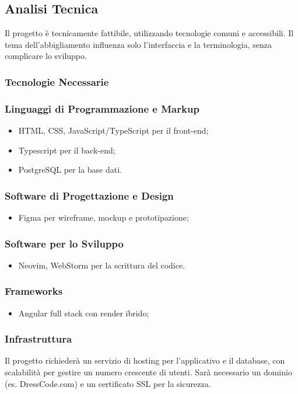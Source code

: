 \documentclass[11pt]{article}
\begin{document}
\subsection{Analisi Tecnica}
Il progetto è tecnicamente fattibile, utilizzando tecnologie comuni e accessibili. Il tema dell'abbigliamento influenza solo l'interfaccia e la terminologia, senza complicare lo sviluppo.

\subsubsection{Tecnologie Necessarie}
\subsubsection*{Linguaggi di Programmazione e Markup}
\begin{itemize}
    \item HTML, CSS, JavaScript/TypeScript per il front-end;
    \item Typescript per il back-end;
    \item PostgreSQL per la base dati.
\end{itemize}

\subsubsection*{Software di Progettazione e Design}
\begin{itemize}
    \item Figma per wireframe, mockup e prototipazione;
\end{itemize}

\subsubsection*{Software per lo Sviluppo}
\begin{itemize}
    \item Neovim, WebStorm per la scrittura del codice.
\end{itemize}

\subsubsection*{Frameworks}
\begin{itemize}
    \item Angular full stack con render ibrido;
\end{itemize}

\subsubsection{Infrastruttura}
Il progetto richiederà un servizio di hosting per l'applicativo e il database, con scalabilità per gestire un numero crescente di utenti. Sarà necessario un dominio (es. DressCode.com) e un certificato SSL per la sicurezza.
\end{document}
